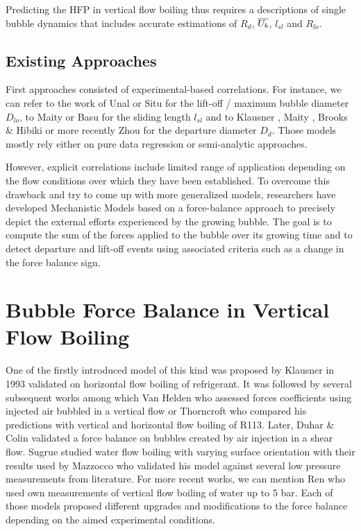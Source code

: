 Predicting the HFP in vertical flow boiling thus requires a descriptions of single bubble dynamics that includes accurate estimations of $R_{d}$, $\overline{U_{b}}$, $l_{sl}$ and $R_{lo}$.

\subsection{Existing Approaches}

First approaches consisted of experimental-based correlations. For instance, we can refer to the work of Unal \cite{unal_maximum_1976} or Situ \etal \cite{situ_bubble_2005} for the lift-off / maximum bubble diameter $D_{lo}$, to Maity \cite{maity_effect_2000} or Basu \etal \cite{basu_wall_2005} for the sliding length $l_{sl}$ and to Klausner \etal \cite{klausner_vapor_1993}, Maity \cite{maity_effect_2000}, Brooks \& Hibiki \cite{brooks_wall_2015} or more recently Zhou \etal \cite{zhou_experimental_2020} for the departure diameter $D_{d}$. Those models mostly rely either on pure data regression or semi-analytic approaches. 

However, explicit correlations include limited range of application depending on the flow conditions over which they have been established. To overcome this drawback and try to come up with more generalized models, researchers have developed Mechanistic Models based on a force-balance approach to precisely depict the external efforts experienced by the growing bubble. The goal is to compute the sum of the forces applied to the bubble over its growing time and to detect departure and lift-off events using associated criteria such as a change in the force balance sign.




\section{Bubble Force Balance in Vertical Flow Boiling}

One of the firstly introduced model of this kind was proposed by Klausner \etal in 1993 \cite{klausner_vapor_1993} validated on horizontal flow boiling of refrigerant. It was followed by several subsequent works among which Van Helden \etal \cite{van_helden_forces_1995} who assessed forces coefficients using injected air bubbled in a vertical flow or Thorncroft \cite{thorncroft_bubble_2001} who compared his predictions with vertical and horizontal flow boiling of R113. Later, Duhar \& Colin \cite{duhar_dynamics_2006} validated a force balance on bubbles created by air injection in a shear flow. Sugrue \etal \cite{sugrue_experimental_2014} studied water flow boiling with varying surface orientation with their results used by Mazzocco \etal \cite{mazzocco_reassessed_2018} who validated his model against several low pressure measurements from literature. For more recent works, we can mention Ren \etal \cite{ren_development_2020} who used own measurements of vertical flow boiling of water up to 5 bar. Each of those models proposed different upgrades and modifications to the force balance depending on the aimed experimental conditions.

